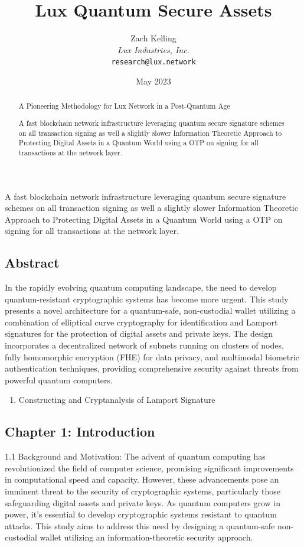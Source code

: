\documentclass[11pt]{article}
\title{Lux Quantum Secure Assets}
\author{Zach Kelling\\\textit{Lux Industries, Inc.}\\\texttt{research@lux.network}}
\date{May 2023}
\begin{document}
\luxcoverpage

\begin{abstract}
A Pioneering Methodology for Lux Network in a Post-Quantum Age

A fast blockchain network infrastructure leveraging quantum secure signature schemes on all transaction signing as well a slightly slower Information Theoretic Approach to Protecting Digital Assets in a Quantum World using a OTP on signing for all transactions at the network layer.
\end{abstract}

\tableofcontents
\newpage


A fast blockchain network infrastructure leveraging quantum secure signature schemes on all transaction signing as well a slightly slower Information Theoretic Approach to Protecting Digital Assets in a Quantum World using a OTP on signing for all transactions at the network layer.


\subsection{Abstract}

In the rapidly evolving quantum computing landscape, the need to develop quantum-resistant cryptographic systems has become more urgent. This study presents a novel architecture for a quantum-safe, non-custodial wallet utilizing a combination of elliptical curve cryptography for identification and Lamport signatures for the protection of digital assets and private keys. The design incorporates a decentralized network of subnets running on clusters of nodes, fully homomorphic encryption (FHE) for data privacy, and multimodal biometric authentication techniques, providing comprehensive security against threats from powerful quantum computers.

\begin{enumerate}
  \item Constructing and Cryptanalysis of Lamport Signature
\end{enumerate}

\subsection{Chapter 1: Introduction}

1.1 Background and Motivation: The advent of quantum computing has revolutionized the field of computer science, promising significant improvements in computational speed and capacity. However, these advancements pose an imminent threat to the security of cryptographic systems, particularly those safeguarding digital assets and private keys. As quantum computers grow in power, it's essential to develop cryptographic systems resistant to quantum attacks. This study aims to address this need by designing a quantum-safe non-custodial wallet utilizing an information-theoretic security approach.
\end{document}
